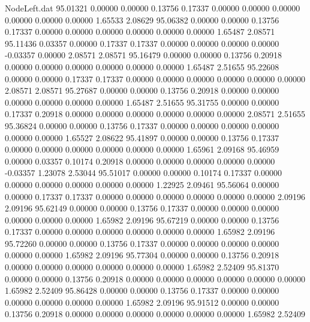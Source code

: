 \begin{filecontents}{NodeLeft.dat}
  95.01321    0.00000    0.00000     0.13756    0.17337    0.00000    0.00000    0.00000    0.00000    0.00000    0.00000    1.65533    2.08629
  95.06382    0.00000    0.00000     0.13756    0.17337    0.00000    0.00000    0.00000    0.00000    0.00000    0.00000    1.65487    2.08571
  95.11436    0.03357    0.00000     0.17337    0.17337    0.00000    0.00000    0.00000    0.00000   -0.03357    0.00000    2.08571    2.08571
  95.16479    0.00000    0.00000     0.13756    0.20918    0.00000    0.00000    0.00000    0.00000    0.00000    0.00000    1.65487    2.51655
  95.22608    0.00000    0.00000     0.17337    0.17337    0.00000    0.00000    0.00000    0.00000    0.00000    0.00000    2.08571    2.08571
  95.27687    0.00000    0.00000     0.13756    0.20918    0.00000    0.00000    0.00000    0.00000    0.00000    0.00000    1.65487    2.51655
  95.31755    0.00000    0.00000     0.17337    0.20918    0.00000    0.00000    0.00000    0.00000    0.00000    0.00000    2.08571    2.51655
  95.36824    0.00000    0.00000     0.13756    0.17337    0.00000    0.00000    0.00000    0.00000    0.00000    0.00000    1.65527    2.08622
  95.41897    0.00000    0.00000     0.13756    0.17337    0.00000    0.00000    0.00000    0.00000    0.00000    0.00000    1.65961    2.09168
  95.46959    0.00000    0.03357     0.10174    0.20918    0.00000    0.00000    0.00000    0.00000    0.00000   -0.03357    1.23078    2.53044
  95.51017    0.00000    0.00000     0.10174    0.17337    0.00000    0.00000    0.00000    0.00000    0.00000    0.00000    1.22925    2.09461
  95.56064    0.00000    0.00000     0.17337    0.17337    0.00000    0.00000    0.00000    0.00000    0.00000    0.00000    2.09196    2.09196
  95.62149    0.00000    0.00000     0.13756    0.17337    0.00000    0.00000    0.00000    0.00000    0.00000    0.00000    1.65982    2.09196
  95.67219    0.00000    0.00000     0.13756    0.17337    0.00000    0.00000    0.00000    0.00000    0.00000    0.00000    1.65982    2.09196
  95.72260    0.00000    0.00000     0.13756    0.17337    0.00000    0.00000    0.00000    0.00000    0.00000    0.00000    1.65982    2.09196
  95.77304    0.00000    0.00000     0.13756    0.20918    0.00000    0.00000    0.00000    0.00000    0.00000    0.00000    1.65982    2.52409
  95.81370    0.00000    0.00000     0.13756    0.20918    0.00000    0.00000    0.00000    0.00000    0.00000    0.00000    1.65982    2.52409
  95.86428    0.00000    0.00000     0.13756    0.17337    0.00000    0.00000    0.00000    0.00000    0.00000    0.00000    1.65982    2.09196
  95.91512    0.00000    0.00000     0.13756    0.20918    0.00000    0.00000    0.00000    0.00000    0.00000    0.00000    1.65982    2.52409

\end{filecontents}
